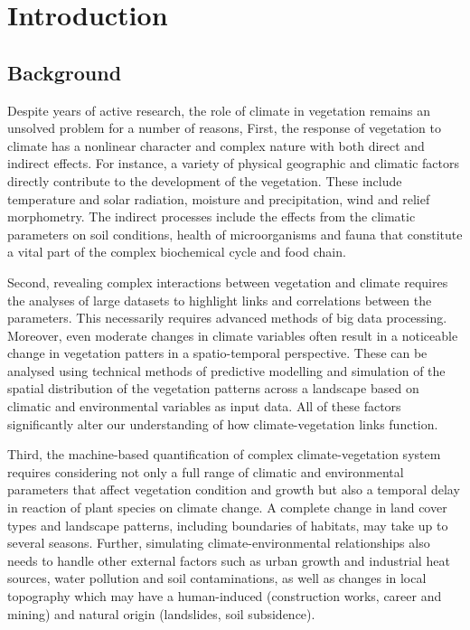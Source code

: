 \documentclass[knowledge,article,submit,pdftex,moreauthors]{Definitions/mdpi}
\begin{document}
\section{Introduction}

\subsection{Background}
Despite years of active research, the role of climate in vegetation remains an unsolved problem for a number of reasons, First, the response of vegetation to climate has a nonlinear character and complex nature with both direct and indirect effects. For instance, a variety of physical geographic and climatic factors directly contribute to the development of the vegetation. These include temperature and solar radiation, moisture and precipitation, wind and relief morphometry. The indirect processes include the effects from the climatic parameters on soil conditions, health of microorganisms and fauna that constitute a vital part of the complex biochemical cycle and food chain. 

Second, revealing complex interactions between vegetation and climate requires the analyses of large datasets to highlight links and correlations between the parameters. This necessarily requires advanced methods of big data processing. Moreover, even moderate changes in climate variables  often result in a noticeable change in vegetation patters in a spatio-temporal perspective. These can be analysed using technical methods of predictive modelling and simulation of the spatial distribution of the vegetation patterns across a landscape based on climatic and environmental variables as input data. All of these factors significantly alter our understanding of how climate-vegetation links function.

Third, the machine-based quantification of complex climate-vegetation system requires considering not only a full range of climatic and environmental parameters that affect vegetation condition and growth but also a temporal delay in reaction of plant species on climate change. A complete change in land cover types and landscape patterns, including boundaries of habitats, may take up to several seasons. Further, simulating climate-environmental relationships also needs to handle other external factors such as urban growth and industrial heat sources, water pollution and soil contaminations, as well as changes in local topography which may have a human-induced (construction works, career and mining) and natural origin (landslides, soil subsidence).
\end{document}
